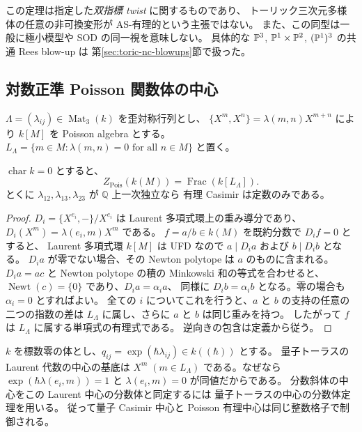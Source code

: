 \begin{remark}[適用範囲]
この定理は指定した\emph{双指標 twist} に関するものであり、
トーリック三次元多様体の任意の非可換変形が AS-有理的という主張ではない。
また、この同型は一般に極小模型や SOD の同一視を意味しない。
具体的な $\mathbb P^3$, $\mathbb P^1\times\mathbb P^2$, $(\mathbb P^1)^3$ の共通 Rees blow-up は
第\ref{sec:toric-nc-blowups}節で扱った。
\end{remark}

\subsection{対数正準 Poisson 関数体の中心}
$\Lambda=(\lambda_{ij})\in\operatorname{Mat}_3(k)$ を歪対称行列とし、
$\{X^m,X^n\}=\lambda(m,n)X^{m+n}$ により $k[M]$ を Poisson algebra とする。
$L_\Lambda=\{m\in M: \lambda(m,n)=0\text{ for all }n\in M\}$ と置く。

\begin{proposition}[有理 Casimir 体]\label{prop:toric-Poisson-center}
$\operatorname{char}k=0$ とすると、
\[
 Z_{\mathrm{Pois}}(k(M))=\operatorname{Frac}(k[L_\Lambda]).
\]
とくに $\lambda_{12},\lambda_{13},\lambda_{23}$ が $\mathbb Q$ 上一次独立なら
有理 Casimir は定数のみである。
\end{proposition}
\begin{proof}
$D_i=\{X^{e_i},-\}/X^{e_i}$ は Laurent 多項式環上の重み導分であり、
$D_i(X^m)=\lambda(e_i,m)X^m$ である。
$f=a/b\in k(M)$ を既約分数で $D_i f=0$ とすると、
Laurent 多項式環 $k[M]$ は UFD なので
$a\mid D_i a$ および $b\mid D_i b$ となる。
$D_i a$ が零でない場合、その Newton polytope は $a$ のものに含まれる。
$D_i a=ac$ と Newton polytope の積の Minkowski 和の等式を合わせると、
$\operatorname{Newt}(c)=\{0\}$ であり、$D_i a=\alpha_i a$、
同様に $D_i b=\alpha_i b$ となる。零の場合も $\alpha_i=0$ とすればよい。
全ての $i$ についてこれを行うと、$a$ と $b$ の支持の任意の二つの指数の差は
$L_\Lambda$ に属し、さらに $a$ と $b$ は同じ重みを持つ。
したがって $f$ は $L_\Lambda$ に属する単項式の有理式である。
逆向きの包含は定義から従う。
\end{proof}

\begin{remark}[形式的量子化]
$k$ を標数零の体とし、$q_{ij}=\exp(\hbar\lambda_{ij})\in k((\hbar))$ とする。
量子トーラスの Laurent 代数の中心の基底は
$X^m\;(m\in L_\Lambda)$ である。なぜなら
$\exp(\hbar\lambda(e_i,m))=1$ と
$\lambda(e_i,m)=0$ が同値だからである。
分数斜体の中心をこの Laurent 中心の分数体と同定するには
量子トーラスの中心の分数体定理を用いる。
従って量子 Casimir 中心と Poisson 有理中心は同じ整数格子で制御される。
\end{remark}


